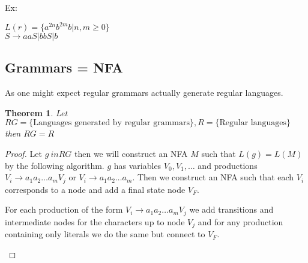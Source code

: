 \documentclass[11pt]{exam}
\newtheorem{theorem}{Theorem}[section]
\begin{document}
Ex:
\begin{center}
$L(r) = \{a^{2n}b^{2m}b | n,m \geq 0 \}$\\
$S \rightarrow aaS | bbS | b$
\end{center} 

\subsection{Grammars = NFA}
As one might expect regular grammars actually generate regular languages.

\begin{theorem}
Let $RG = \{ \text{Languages generated by regular grammars} \}, R = \{ \text{Regular languages} \}$ then $RG = R$
\end{theorem}

\begin{proof}
Let $g \ in RG$ then we will construct an NFA $M$ such that $L(g) = L(M)$
by the following algorithm. $g$ has variables $V_0,V_1,\dots$ and productions $V_i \rightarrow a_1a_2\dots a_mV_j$ or $V_i \rightarrow a_1a_2\dots a_m$. Then we construct an NFA such that each $V_i$ corresponds to a node and add a final state node $V_F$. 

\begin{center}
\end{center}


For each production of the form $V_i \rightarrow a_1a_2\dots a_mV_j$ we add transitions and intermediate nodes for the characters up to node $V_j$ and for any production containing only literals we do the same but connect to $V_F$.

\begin{center}
\end{center}


\end{proof}
\end{document}
